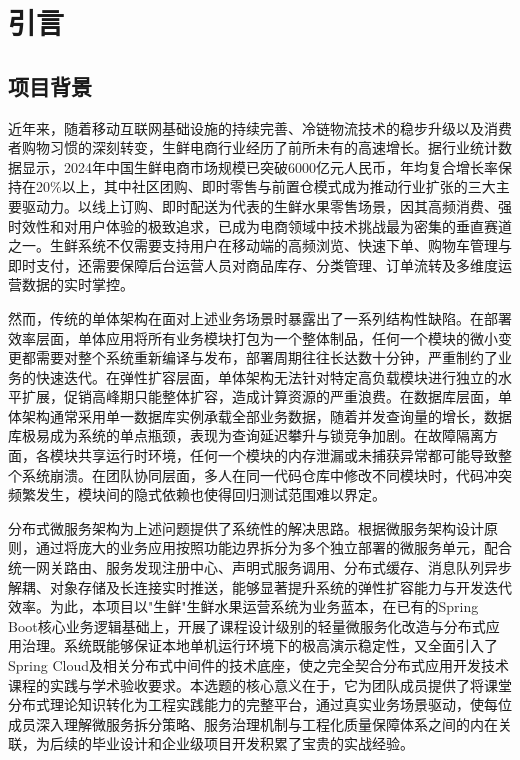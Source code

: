 
\chapter{引言}

\section{项目背景}

近年来，随着移动互联网基础设施的持续完善、冷链物流技术的稳步升级以及消费者购物习惯的深刻转变，生鲜电商行业经历了前所未有的高速增长。据行业统计数据显示，2024年中国生鲜电商市场规模已突破6000亿元人民币，年均复合增长率保持在20\%以上，其中社区团购、即时零售与前置仓模式成为推动行业扩张的三大主要驱动力。以线上订购、即时配送为代表的生鲜水果零售场景，因其高频消费、强时效性和对用户体验的极致追求，已成为电商领域中技术挑战最为密集的垂直赛道之一。生鲜系统不仅需要支持用户在移动端的高频浏览、快速下单、购物车管理与即时支付，还需要保障后台运营人员对商品库存、分类管理、订单流转及多维度运营数据的实时掌控。

然而，传统的单体架构在面对上述业务场景时暴露出了一系列结构性缺陷。在部署效率层面，单体应用将所有业务模块打包为一个整体制品，任何一个模块的微小变更都需要对整个系统重新编译与发布，部署周期往往长达数十分钟，严重制约了业务的快速迭代。在弹性扩容层面，单体架构无法针对特定高负载模块进行独立的水平扩展，促销高峰期只能整体扩容，造成计算资源的严重浪费。在数据库层面，单体架构通常采用单一数据库实例承载全部业务数据，随着并发查询量的增长，数据库极易成为系统的单点瓶颈，表现为查询延迟攀升与锁竞争加剧。在故障隔离方面，各模块共享运行时环境，任何一个模块的内存泄漏或未捕获异常都可能导致整个系统崩溃。在团队协同层面，多人在同一代码仓库中修改不同模块时，代码冲突频繁发生，模块间的隐式依赖也使得回归测试范围难以界定。

分布式微服务架构为上述问题提供了系统性的解决思路。根据微服务架构设计原则，通过将庞大的业务应用按照功能边界拆分为多个独立部署的微服务单元，配合统一网关路由、服务发现注册中心、声明式服务调用、分布式缓存、消息队列异步解耦、对象存储及长连接实时推送，能够显著提升系统的弹性扩容能力与开发迭代效率。为此，本项目以"生鲜"生鲜水果运营系统为业务蓝本，在已有的Spring Boot核心业务逻辑基础上，开展了课程设计级别的轻量微服务化改造与分布式应用治理。系统既能够保证本地单机运行环境下的极高演示稳定性，又全面引入了Spring Cloud及相关分布式中间件的技术底座，使之完全契合分布式应用开发技术课程的实践与学术验收要求。本选题的核心意义在于，它为团队成员提供了将课堂分布式理论知识转化为工程实践能力的完整平台，通过真实业务场景驱动，使每位成员深入理解微服务拆分策略、服务治理机制与工程化质量保障体系之间的内在关联，为后续的毕业设计和企业级项目开发积累了宝贵的实战经验。

